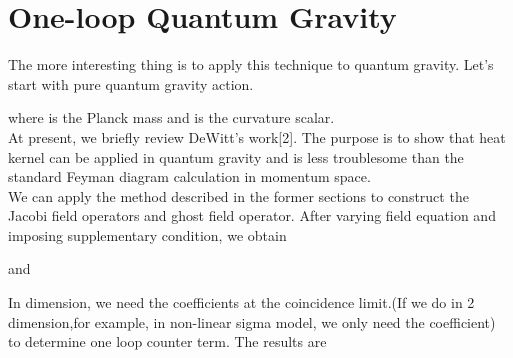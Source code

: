 \documentclass[a4paper,12 pt]{article}
\begin{document}
\section{One-loop Quantum Gravity}
The more interesting thing is to apply this technique to quantum
gravity. Let's start with pure quantum gravity action.
\begin{center}
\coordHE{}
\end{center}
where \myHighlight{$\mu$}\coordHE{} is the Planck mass and \coordHE{} is the curvature scalar.\\
At present, we briefly review DeWitt's work[2]. The purpose is to
show that heat kernel can be applied in quantum gravity and is
less troublesome than the standard Feyman diagram calculation in momentum space. \\
We can apply the method described in the former sections to
construct the Jacobi field operators and ghost field operator.
After varying field equation and imposing supplementary condition,
we obtain
\begin{center}
\coordHE{}
\end{center}
and
\begin{center}
\coordHE{}
\end{center}
In \coordHE{}dimension, we need the \coordHE{} coefficients at the
coincidence limit.(If we do in 2 dimension,for example, in
non-linear sigma model, we only need the \coordHE{} coefficient) to
determine one loop counter term. The results are
\begin{center}
\coordHE{}
\end{center}
\end{document}
